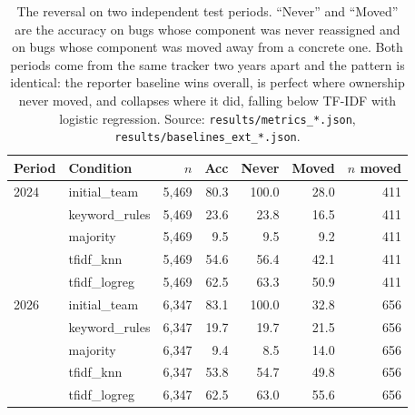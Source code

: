 \begin{table}[t]\centering
\small
\caption{The reversal on two independent test periods. ``Never'' and ``Moved'' are the accuracy on bugs whose component was never reassigned and on bugs whose component was moved away from a concrete one. Both periods come from the same tracker two years apart and the pattern is identical: the reporter baseline wins overall, is perfect where ownership never moved, and collapses where it did, falling below TF-IDF with logistic regression. Source: \texttt{results/metrics\_*.json}, \texttt{results/baselines\_ext\_*.json}.}
\label{tab:periods}
\begin{tabular}{llrrrrr}
\toprule
Period & Condition & $n$ & Acc & Never & Moved & $n$ moved \\
\midrule
2024 & initial\_team & 5{,}469 & 80.3 & 100.0 & 28.0 & 411 \\
 & keyword\_rules & 5{,}469 & 23.6 & 23.8 & 16.5 & 411 \\
 & majority & 5{,}469 & 9.5 & 9.5 & 9.2 & 411 \\
 & tfidf\_knn & 5{,}469 & 54.6 & 56.4 & 42.1 & 411 \\
 & tfidf\_logreg & 5{,}469 & 62.5 & 63.3 & 50.9 & 411 \\
\midrule
2026 & initial\_team & 6{,}347 & 83.1 & 100.0 & 32.8 & 656 \\
 & keyword\_rules & 6{,}347 & 19.7 & 19.7 & 21.5 & 656 \\
 & majority & 6{,}347 & 9.4 & 8.5 & 14.0 & 656 \\
 & tfidf\_knn & 6{,}347 & 53.8 & 54.7 & 49.8 & 656 \\
 & tfidf\_logreg & 6{,}347 & 62.5 & 63.0 & 55.6 & 656 \\
\bottomrule
\end{tabular}
\end{table}
